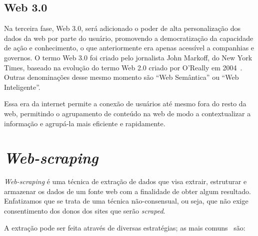 \subsection{Web 3.0}

Na terceira fase, Web 3.0, será adicionado o poder de alta personalização dos dados da web por parte do usuário, promovendo a democratização da capacidade de ação e conhecimento, o que anteriormente era apenas acessível a companhias e governos.
O termo Web 3.0 foi criado pelo jornalista John Markoff, do New York Times, baseado na evolução do termo Web 2.0 criado por O’Really em 2004~\cite{Web32}. Outras denominações desse mesmo momento são ``Web Semântica'' ou ``Web Inteligente''.

Essa era da internet permite a conexão de usuários até mesmo fora do resto da web, permitindo o agrupamento de conteúdo na web de modo a contextualizar a informação e agrupá-la mais eficiente e rapidamente.

\section{\textit{Web-scraping}}

\textit{Web-scraping} é uma técnica de extração de dados que visa extrair, estruturar e armazenar os dados de um fonte web com a finalidade de obter algum resultado.
Enfatizamos que se trata de uma técnica não-consensual, ou seja, que não exige consentimento dos donos dos sites que serão \textit{scraped}.

A extração pode ser feita através de diversas estratégias; as mais comuns~\cite{Scraping1} são: 

